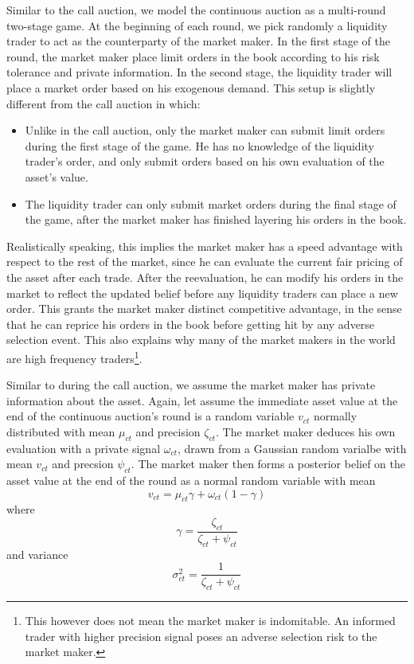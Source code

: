 \documentclass{article}
\begin{document}
Similar to the call auction, we model the continuous auction as a multi-round two-stage game. At the beginning of each round, we pick randomly a liquidity trader to act as the counterparty of the market maker. In the first stage of the round, the market maker place limit orders in the book according to his risk tolerance and private information. In the second stage, the liquidity trader will place a market order based on his exogenous demand. This setup is slightly different from the call auction in which:
\begin{itemize}
\item Unlike in the call auction, only the market maker can submit limit orders during the first stage of the game. He has no knowledge of the liquidity trader's order, and only submit orders based on his own evaluation of the asset's value.
\item The liquidity trader can only submit market orders during the final stage of the game, after the market maker has finished layering his orders in the book.
\end{itemize}
Realistically speaking, this implies the market maker has a speed advantage with respect to the rest of the market, since he can evaluate the current fair pricing of the asset after each trade. After the reevaluation, he can modify his orders in the market to reflect the updated belief before any liquidity traders can place a new order. This grants the market maker distinct competitive advantage, in the sense that he can reprice his orders in the book before getting hit by any adverse selection event. This also explains why many of the market makers in the world are high frequency traders\footnote{This however does not mean the market maker is indomitable. An informed trader with higher precision signal poses an adverse selection risk to the market maker.}. 

Similar to during the call auction, we assume the market maker has private information about the asset. Again, let assume the immediate asset value at the end of the continuous auction's round is a random variable $v_{ct}$ normally distributed with mean $\mu_{ct}$ and precision $\zeta_{ct}$. The market maker deduces his own evaluation with a private signal $\omega_{ct}$, drawn from a Gaussian random varialbe with mean $v_{ct}$ and precsion $\psi_{ct}$. The market maker then forms a posterior belief on the asset value at the end of the round as a normal random variable with mean
\[
v_{ct}=\mu_{ct} \gamma + \omega_{ct}(1 - \gamma)
\]
where
\[
\gamma = \frac{\zeta_{ct}}{\zeta_{ct}+\psi_{ct}}
\]
and variance
\[
\sigma_{ct}^2=\frac{1}{\zeta_{ct}+\psi_{ct}}
\]
\end{document}
